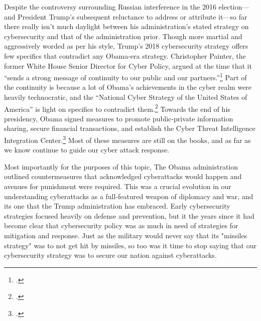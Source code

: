 \documentclass{report}
\begin{document}
\begin{refsegment}
Despite the controversy surrounding Russian interference in the 2016 election---and President Trump's subsequent reluctance to address or attribute it---so far there really isn't much daylight between his administration's stated strategy on cybersecurity and that of the administration prior. Though more martial and aggressively worded as per his style, Trump's 2018 cybersecurity strategy offers few specifics that contradict any Obama-era strategy. Christopher Painter, the former White House Senior Director for Cyber Policy, argued at the time that it ``sends a strong message of continuity to our public and our partners.''\footcite[Painter also served at the State Department for six years as the Coordinator for Cyber Issues, which at the time was an Assistant Secretary level position. Since then, its status within the department has fluctuated wildly. Rex Tillerson, Trump's first Secretary of State, announced that he would abolish the office and merge it into State's Bureau of Economic Affairs. Then, just a few months later, he proposed creating an entirely new department bureau with a Senate-confirmed Assistant Secretary, possibly in response to criticism of his first decision. Though current Secretary Mike Pompeo appears to have more interest in cyber policy, the State Department still has not reestablished a high level cyber position.]{painter_white_2018} Part of the continuity is because a lot of Obama's achievements in the cyber realm were heavily technocratic, and the ``National Cyber Strategy of the United States of America'' is light on specifics to contradict them.\footcite{guest_blogger_white_2018} Towards the end of his presidency, Obama signed measures to promote public-private information sharing, secure financial transactions, and establish the Cyber Threat Intelligence Integration Center.\footcite[Among other actions taken during the Obama presidency, these were sufficenct for PolitiFact to update its 2013 rating of his promise to ``Promise Kept.'']{carroll_obama_2016} Most of these measures are still on the books, and as far as we know continue to guide our cyber attack response.

Most importantly for the purposes of this topic, The Obama administration outlined countermeasures that acknowledged cyberattacks would happen and avenues for punishment were required. This was a crucial evolution in our understanding cyberattacks as a full-featured weapon of diplomacy and war, and its one that the Trump administration has embraced. Early cybersecurity strategies focused heavily on defense and prevention, but it the years since it had become clear that cybersecurity policy was as much in need of strategies for mitigation and response. Just as the military would never say that its "missiles strategy" was to not get hit by missiles, so too was it time to stop saying that our cybersecurity strategy was to secure our nation against cyberattacks.


\end{refsegment}
\end{document}
